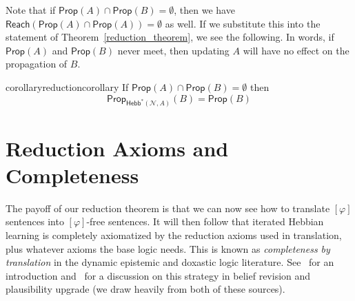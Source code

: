 \documentclass[letterpaper]{article}
\theoremstyle{definition}
\newcommand{\preds}[1]{\mbox{preds}(#1)}
\newcommand{\Net}{\mathcal{N}}
\newcommand{\Prop}{\mathsf{Prop}}
\newcommand{\Reach}{\mathsf{Reach}}
\newcommand{\Hebbstar}[2]{\mathsf{Hebb}^*(#1, #2)}
\newcommand{\Hebbop}[1]{[#1]}
\begin{document}


Note that if $\Prop(A) \cap \Prop(B) = \emptyset$, then we have $\Reach(\Prop(A) \cap \Prop(A)) = \emptyset$ as well.  If we substitute this into the statement of Theorem~\ref{reduction_theorem}, we see the following.  In words, if $\Prop(A)$ and $\Prop(B)$ never meet, then updating $A$ will have no effect on the propagation of $B$.

\begin{restatable}{corollary}{reductioncorollary} If $\Prop(A) \cap \Prop(B) = \emptyset$ then 
\[ \Prop_{\Hebbstar{\Net}{A}}(B) = \Prop(B) \]
\end{restatable}

\section{Reduction Axioms and Completeness}

The payoff of our reduction theorem is that we can now see how to translate $\Hebbop{\varphi}$ sentences into $\Hebbop{\varphi}$-free sentences.  It will then follow that iterated Hebbian learning is completely axiomatized by the reduction axioms used in translation, plus whatever axioms the base logic needs.  This is known as \emph{completeness by translation} in the dynamic epistemic and doxastic logic literature.  See~\cite{DELBook} for an introduction and~\cite{van2007beliefrevision} for a discussion on this strategy in belief revision and plausibility upgrade (we draw heavily from both of these sources).
\end{document}
